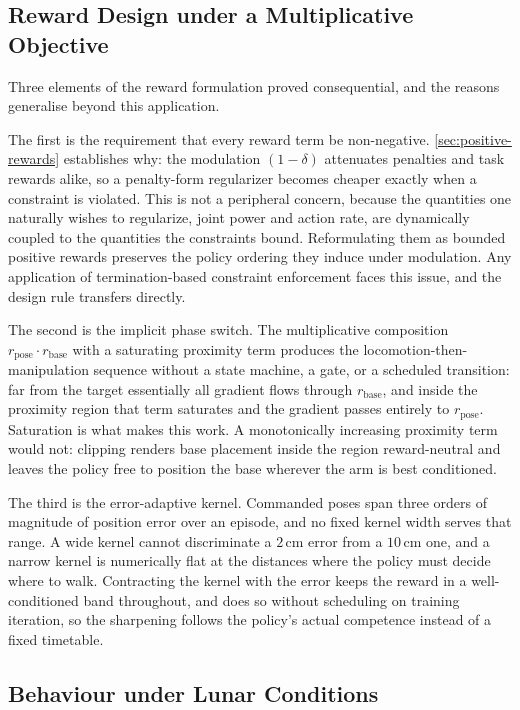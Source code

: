 \subsection{Reward Design under a Multiplicative Objective}

Three elements of the reward formulation proved consequential, and the reasons generalise beyond this application.

The first is the requirement that every reward term be non-negative. \cref{sec:positive-rewards} establishes why: the modulation $(1-\delta)$ attenuates penalties and task rewards alike, so a penalty-form regularizer becomes cheaper exactly when a constraint is violated. This is not a peripheral concern, because the quantities one naturally wishes to regularize, joint power and action rate, are dynamically coupled to the quantities the constraints bound. Reformulating them as bounded positive rewards preserves the policy ordering they induce under modulation. Any application of termination-based constraint enforcement faces this issue, and the design rule transfers directly.

The second is the implicit phase switch. The multiplicative composition $r_{\text{pose}} \cdot r_{\text{base}}$ with a saturating proximity term produces the locomotion-then-manipulation sequence without a state machine, a gate, or a scheduled transition: far from the target essentially all gradient flows through $r_{\text{base}}$, and inside the proximity region that term saturates and the gradient passes entirely to $r_{\text{pose}}$. Saturation is what makes this work. A monotonically increasing proximity term would not: clipping renders base placement inside the region reward-neutral and leaves the policy free to position the base wherever the arm is best conditioned.

The third is the error-adaptive kernel. Commanded poses span three orders of magnitude of position error over an episode, and no fixed kernel width serves that range. A wide kernel cannot discriminate a $2\,$cm error from a $10\,$cm one, and a narrow kernel is numerically flat at the distances where the policy must decide where to walk. Contracting the kernel with the error keeps the reward in a well-conditioned band throughout, and does so without scheduling on training iteration, so the sharpening follows the policy's actual competence instead of a fixed timetable.

\subsection{Behaviour under Lunar Conditions}

